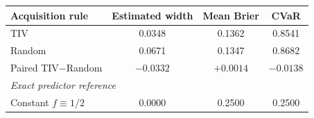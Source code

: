 \begin{tabular}{lccc}
\toprule
Acquisition rule & Estimated width & Mean Brier & CVaR\\
\midrule
TIV & 0.0348 & 0.1362 & 0.8541\\
Random & 0.0671 & 0.1347 & 0.8682\\
Paired TIV$-$Random & $-0.0332$ & $+0.0014$ & $-0.0138$\\
\midrule
\multicolumn{4}{l}{\textit{Exact predictor reference}}\\
Constant $f\equiv1/2$ & 0.0000 & 0.2500 & 0.2500\\
\bottomrule
\end{tabular}
\par{}

